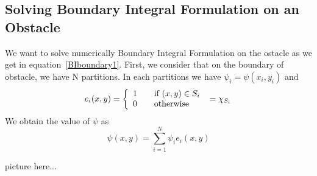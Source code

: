 \documentclass[a4paper,12pt]{article}
\begin{document}
\subsection{Solving Boundary Integral Formulation on an Obstacle}

We want to solve numerically Boundary Integral Formulation on the ostacle as we get in equation~\eqref{BIboundary1}. 
First, we consider that on the boundary of obstacle, we have N partitions. In each partitions we have
$\psi_i=\psi(x_i,y_i)$ and 
 \[ e_i(x,y) = \left\{
  \begin{array}{l l}
    1 & \quad \text{if $(x,y)\in S_i$ }\\
    0 & \quad \text{otherwise}
  \end{array} =\chi_{S_i}\right.\]
We obtain the value of $\psi$ as
\begin{equation}
 \psi(x,y)=\sum\limits_{i=1}^N \psi_i e_i(x,y)
\end{equation}

picture here...
\end{document}

